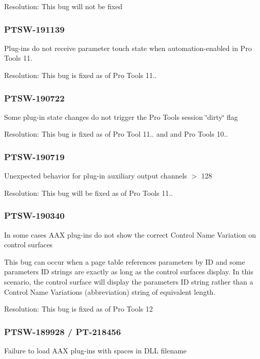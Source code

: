 Resolution\+: This bug will not be fixed\hypertarget{a00374_PTSW-191139}{}\subsubsection{P\+T\+S\+W-\/191139}\label{a00374_PTSW-191139}
Plug-\/ins do not receive parameter touch state when automation-\/enabled in Pro Tools 11.

Resolution\+: This bug is fixed as of Pro Tools 11..\hypertarget{a00374_PTSW-190722}{}\subsubsection{P\+T\+S\+W-\/190722}\label{a00374_PTSW-190722}
Some plug-\/in state changes do not trigger the Pro Tools session \char`\"{}dirty\char`\"{} flag

Resolution\+: This bug is fixed as of Pro Tool 11.. and and Pro Tools 10..\hypertarget{a00374_PTSW-190719}{}\subsubsection{P\+T\+S\+W-\/190719}\label{a00374_PTSW-190719}
Unexpected behavior for plug-\/in auxiliary output channels $>$ 128

Resolution\+: This bug will be fixed as of Pro Tools 11..\hypertarget{a00374_PTSW-190340}{}\subsubsection{P\+T\+S\+W-\/190340}\label{a00374_PTSW-190340}
In some cases A\+A\+X plug-\/ins do not show the correct Control Name Variation on control surfaces

This bug can occur when a page table references parameters by I\+D and some parameters\textquotesingle{} I\+D strings are exactly as long as the control surface\textquotesingle{}s display. In this scenario, the control surface will display the parameter\textquotesingle{}s I\+D string rather than a Control Name Variations (abbreviation) string of equivalent length.

Resolution\+: This bug is fixed as of Pro Tools 12\hypertarget{a00374_PTSW-189928}{}\subsubsection{P\+T\+S\+W-\/189928 / P\+T-\/218456}\label{a00374_PTSW-189928}
Failure to load A\+A\+X plug-\/ins with spaces in D\+L\+L filename

